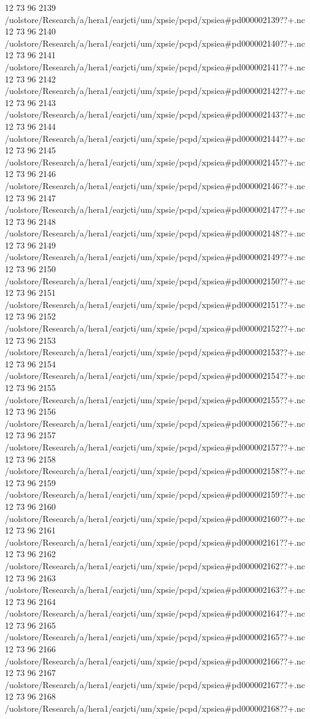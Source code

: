 12 73 96
2139
/uolstore/Research/a/hera1/earjcti/um/xpsie/pcpd/xpsiea#pd000002139??+.nc
12 73 96
2140
/uolstore/Research/a/hera1/earjcti/um/xpsie/pcpd/xpsiea#pd000002140??+.nc
12 73 96
2141
/uolstore/Research/a/hera1/earjcti/um/xpsie/pcpd/xpsiea#pd000002141??+.nc
12 73 96
2142
/uolstore/Research/a/hera1/earjcti/um/xpsie/pcpd/xpsiea#pd000002142??+.nc
12 73 96
2143
/uolstore/Research/a/hera1/earjcti/um/xpsie/pcpd/xpsiea#pd000002143??+.nc
12 73 96
2144
/uolstore/Research/a/hera1/earjcti/um/xpsie/pcpd/xpsiea#pd000002144??+.nc
12 73 96
2145
/uolstore/Research/a/hera1/earjcti/um/xpsie/pcpd/xpsiea#pd000002145??+.nc
12 73 96
2146
/uolstore/Research/a/hera1/earjcti/um/xpsie/pcpd/xpsiea#pd000002146??+.nc
12 73 96
2147
/uolstore/Research/a/hera1/earjcti/um/xpsie/pcpd/xpsiea#pd000002147??+.nc
12 73 96
2148
/uolstore/Research/a/hera1/earjcti/um/xpsie/pcpd/xpsiea#pd000002148??+.nc
12 73 96
2149
/uolstore/Research/a/hera1/earjcti/um/xpsie/pcpd/xpsiea#pd000002149??+.nc
12 73 96
2150
/uolstore/Research/a/hera1/earjcti/um/xpsie/pcpd/xpsiea#pd000002150??+.nc
12 73 96
2151
/uolstore/Research/a/hera1/earjcti/um/xpsie/pcpd/xpsiea#pd000002151??+.nc
12 73 96
2152
/uolstore/Research/a/hera1/earjcti/um/xpsie/pcpd/xpsiea#pd000002152??+.nc
12 73 96
2153
/uolstore/Research/a/hera1/earjcti/um/xpsie/pcpd/xpsiea#pd000002153??+.nc
12 73 96
2154
/uolstore/Research/a/hera1/earjcti/um/xpsie/pcpd/xpsiea#pd000002154??+.nc
12 73 96
2155
/uolstore/Research/a/hera1/earjcti/um/xpsie/pcpd/xpsiea#pd000002155??+.nc
12 73 96
2156
/uolstore/Research/a/hera1/earjcti/um/xpsie/pcpd/xpsiea#pd000002156??+.nc
12 73 96
2157
/uolstore/Research/a/hera1/earjcti/um/xpsie/pcpd/xpsiea#pd000002157??+.nc
12 73 96
2158
/uolstore/Research/a/hera1/earjcti/um/xpsie/pcpd/xpsiea#pd000002158??+.nc
12 73 96
2159
/uolstore/Research/a/hera1/earjcti/um/xpsie/pcpd/xpsiea#pd000002159??+.nc
12 73 96
2160
/uolstore/Research/a/hera1/earjcti/um/xpsie/pcpd/xpsiea#pd000002160??+.nc
12 73 96
2161
/uolstore/Research/a/hera1/earjcti/um/xpsie/pcpd/xpsiea#pd000002161??+.nc
12 73 96
2162
/uolstore/Research/a/hera1/earjcti/um/xpsie/pcpd/xpsiea#pd000002162??+.nc
12 73 96
2163
/uolstore/Research/a/hera1/earjcti/um/xpsie/pcpd/xpsiea#pd000002163??+.nc
12 73 96
2164
/uolstore/Research/a/hera1/earjcti/um/xpsie/pcpd/xpsiea#pd000002164??+.nc
12 73 96
2165
/uolstore/Research/a/hera1/earjcti/um/xpsie/pcpd/xpsiea#pd000002165??+.nc
12 73 96
2166
/uolstore/Research/a/hera1/earjcti/um/xpsie/pcpd/xpsiea#pd000002166??+.nc
12 73 96
2167
/uolstore/Research/a/hera1/earjcti/um/xpsie/pcpd/xpsiea#pd000002167??+.nc
12 73 96
2168
/uolstore/Research/a/hera1/earjcti/um/xpsie/pcpd/xpsiea#pd000002168??+.nc
